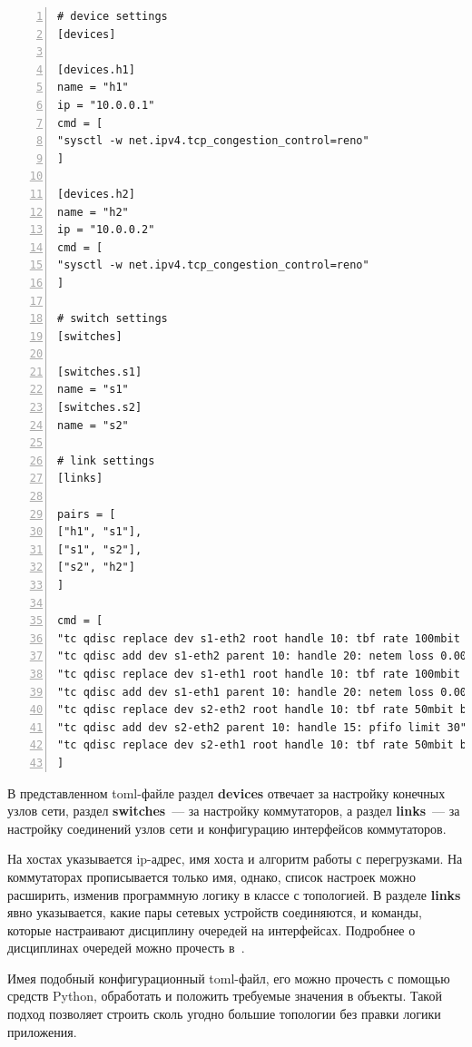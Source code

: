 \documentclass[60x84/16,8pt]{ittmm}
\begin{document}
\begin{lstlisting}[breaklines=true, numbers=left,
  basicstyle=\ttfamily\small, xleftmargin=\parindent, caption={Пример  toml-файла с
    описанием топологии и настроек сети}, label=lst1] 
# device settings
[devices]

[devices.h1]
name = "h1"
ip = "10.0.0.1"
cmd = [
"sysctl -w net.ipv4.tcp_congestion_control=reno"
]

[devices.h2]
name = "h2"
ip = "10.0.0.2"
cmd = [
"sysctl -w net.ipv4.tcp_congestion_control=reno"
]

# switch settings
[switches]

[switches.s1]
name = "s1"
[switches.s2]
name = "s2"

# link settings
[links]

pairs = [
["h1", "s1"],
["s1", "s2"],
["s2", "h2"]
]

cmd = [
"tc qdisc replace dev s1-eth2 root handle 10: tbf rate 100mbit burst 50000 limit 150000",
"tc qdisc add dev s1-eth2 parent 10: handle 20: netem loss 0.001% delay 30ms 7ms distribution normal",
"tc qdisc replace dev s1-eth1 root handle 10: tbf rate 100mbit burst 50000 limit 150000",
"tc qdisc add dev s1-eth1 parent 10: handle 20: netem loss 0.001% delay 30ms 7ms distribution normal",
"tc qdisc replace dev s2-eth2 root handle 10: tbf rate 50mbit burst 25000 limit 75000",
"tc qdisc add dev s2-eth2 parent 10: handle 15: pfifo limit 30",
"tc qdisc replace dev s2-eth1 root handle 10: tbf rate 50mbit burst 25000 limit 75000"
]
\end{lstlisting}

В представленном toml-файле раздел \textbf{devices} отвечает за
настройку конечных узлов сети, раздел \textbf{switches}~--- за
настройку коммутаторов, а раздел \textbf{links}~--- за настройку
соединений узлов сети и конфигурацию интерфейсов коммутаторов.

На хостах указывается ip-адрес, имя хоста и алгоритм работы с
перегрузками. На коммутаторах прописывается только имя, однако, список
настроек можно расширить, изменив программную логику в классе с
топологией. В разделе \textbf{links} явно указывается, какие пары
сетевых устройств соединяются, и команды, которые настраивают
дисциплину очередей на интерфейсах. Подробнее о дисциплинах очередей
можно прочесть в~\cite{qdisc}.

Имея подобный конфигурационный toml-файл, его можно прочесть с помощью
средств Python, обработать и положить требуемые значения в объекты.
Такой подход позволяет строить сколь угодно большие топологии без
правки логики приложения.
\end{document}
